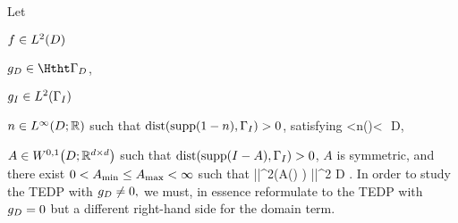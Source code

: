 Let
\bit
\item $f\in \LtD$ 
\item $\gD\in \HthtGD$,
\item $\gI\in \LtGI$
\item $n\in \LiDRR$ such that $\dist\mleft(\supp\mleft(1-n\mright),\GI\mright)>0$, satisfying
<\nmin \leq n\mleft(\bx\mright)\leq\nmax<\infty\,\,  \bx \in D,
\eeq
\item $A \in \WoiDRRdtd$ such that $\dist\mleft(\supp\mleft(I -A\mright),\GI\mright)>0$, $A$ is symmetric, and there exist $0<A_{\min}\leq A_{\max}<\infty$ such that
\beq\label{eq:AellEDP}
 \Amin |\bxi|^2\leq\mleft(A\mleft(\bx\mright) \bxi\mright) \cdot \overline{ \bxi}  \leq \Amax|\bxi|^2 \quad{}\bx \in D  \bxi\in \CCd.
\eeq
\eit
In order to study the TEDP with $g_{D}\neq0,$ we must, in essence reformulate to the TEDP with $g_{D}=0$ but a different right-hand side for the domain term.

